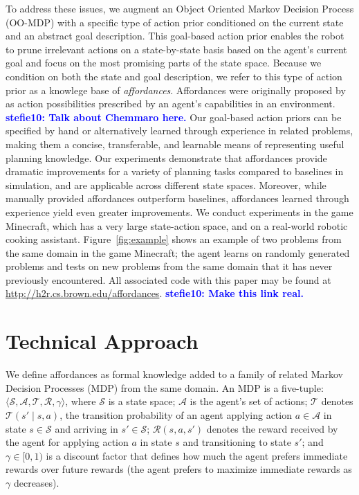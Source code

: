 \documentclass[letterpaper]{article}
\newcommand{\stnote}[1]{\textcolor{Blue}{\textbf{stefie10: #1}}}
\begin{document}
To address these issues, we augment an Object Oriented Markov Decision
Process (OO-MDP) with a specific type of action prior conditioned on
the current state and an abstract goal description.  This goal-based
action prior enables the robot to prune irrelevant actions on a
state-by-state basis based on the agent's current goal and focus on
the most promising parts of the state space.  Because we condition on
both the state and goal description, we refer to this type of action
prior as a knowlege base of {\em affordances}.  Affordances were
originally proposed by \citet{gibson77} as action possibilities
prescribed by an agent's capabilities in an environment. \stnote{Talk
  about Chemmaro here.}  Our goal-based action priors can be specified
by hand or alternatively learned through experience in related
problems, making them a concise, transferable, and learnable means of
representing useful planning knowledge. Our experiments demonstrate
that affordances provide dramatic improvements for a variety of
planning tasks compared to baselines in simulation, and are applicable
across different state spaces.  Moreover, while manually provided
affordances outperform baselines, affordances learned through
experience yield even greater improvements.  We conduct experiments in
the game Minecraft, which has a very large state-action space, and on
a real-world robotic cooking assistant.  Figure~\ref{fig:example}
shows an example of two problems from the same domain in the game
Minecraft; the agent learns on randomly generated problems and tests
on new problems from the same domain that it has never previously
encountered.  All associated code with this paper may be found at
\url{http://h2r.cs.brown.edu/affordances}.  \stnote{Make this link
  real.}


\section{Technical Approach}
\label{sec:affordances}



We define affordances as formal knowledge added to a family of related
Markov Decision Processes (MDP) from the same domain.  An MDP is a
five-tuple: $\langle \mathcal{S}, \mathcal{A}, \mathcal{T},
\mathcal{R}, \gamma \rangle$, where $\mathcal{S}$ is a state space;
$\mathcal{A}$ is the agent's set of actions; $\mathcal{T}$ denotes
$\mathcal{T}(s' \mid s,a)$, the transition probability of an agent
applying action $a \in \mathcal{A}$ in state $s \in \mathcal{S}$ and
arriving in $s' \in \mathcal{S}$; $\mathcal{R}(s,a,s')$ denotes the
reward received by the agent for applying action $a$ in state $s$ and
transitioning to state $s'$; and $\gamma \in [0, 1)$ is a discount
  factor that defines how much the agent prefers immediate rewards
  over future rewards (the agent prefers to maximize immediate rewards
  as $\gamma$ decreases). 
\end{document}
